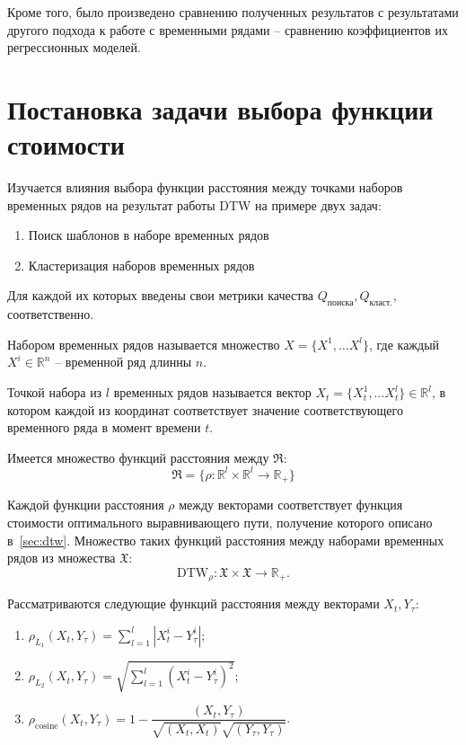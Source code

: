 \documentclass[12pt,twoside]{article}
\begin{document}
        
        Кроме того, было произведено сравнению полученных результатов с результатами другого подхода к работе с временными рядами \--- сравнению коэффициентов их регрессионных моделей.
        
    \section{Постановка задачи выбора функции стоимости}\label{sec:problem}
	    Изучается влияния выбора функции расстояния между точками наборов временных рядов на результат работы DTW на примере двух задач:
        \begin{enumerate}[label=\arabic*)]
            \item Поиск шаблонов в наборе временных рядов
            \item Кластеризация наборов временных рядов
        \end{enumerate} 
        Для каждой их которых введены свои метрики качества $Q_\text{поиска}, Q_\text{класт.}$,  соответственно.
	    
	    \begin{Def}{}  
	        Набором временных рядов называется множество $X = \{X^1,\dots X^l\}$, где каждый $X^i \in \mathbb{R}^{n}$ \--- временной ряд длинны $n$.
	    \end{Def}
	    \begin{Def}{}  
	        Точкой набора из $l$ временных рядов называется вектор $X_t = \{X^1_t,\dots X^l_t\} \in \mathbb{R}^l$, в котором каждой из координат соответствует значение соответствующего временного ряда в момент времени $t$.
	    \end{Def}
	    
        Имеется множество функций расстояния между $\mathfrak{R}$:
            $$\mathfrak{R} = \{\rho: \mathbb{R}^l \times \mathbb{R}^l \rightarrow \mathbb{R}_+ \}$$

        Каждой функции расстояния $\rho$ между векторами соответствует функция стоимости оптимального выравнивающего пути, получение которого описано в~\ref{sec:dtw}. Множество таких функций расстояния между наборами временных рядов из множества $\mathfrak{X}$: 
        $$\text{DTW}_{\rho}: \mathfrak{X} \times \mathfrak{X} \rightarrow \mathbb{R}_+.$$
        
        Рассматриваются следующие функций расстояния между векторами $X_t, Y_\tau$:         
        \begin{enumerate}[label=\arabic*)]
            \item $\rho_{L_1}(X_t, Y_\tau) = {\displaystyle\sum_{l = 1}^{l} |X^i_t - Y^i_\tau|}$;
            \item $\rho_{L_2}(X_t, Y_\tau) = \sqrt{\displaystyle\sum_{l = 1}^{l} (X^i_t - Y^i_\tau)^2}$;
            \item $\rho_\text{cosine}(X_t, Y_\tau) = 1 - \dfrac{(X_t, Y_\tau)}{\sqrt{(X_t, X_t)}\sqrt{(Y_\tau, Y_\tau)}}$.
        \end{enumerate}
        
\end{document}
